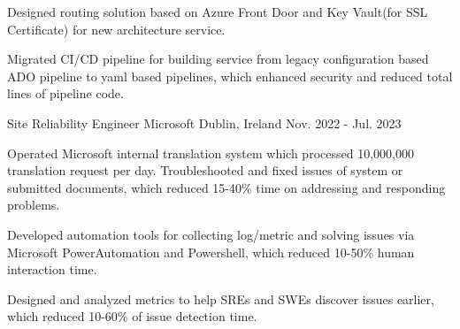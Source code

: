 \begin{cventries}
{\begin{cvitems}
{                }
                \item
                {
                    Designed routing solution based on Azure Front Door and Key Vault(for SSL Certificate) for new architecture service.
                }
                \item
                {
                    Migrated CI/CD pipeline for building service from legacy configuration based ADO pipeline to yaml based pipelines, which enhanced security and reduced total lines of pipeline code.
                }
            \end{cvitems}
        }

    \cventry
        {Site Reliability Engineer}
        {Microsoft}
        {Dublin, Ireland}
        {Nov. 2022 - Jul. 2023}
        {
            \begin{cvitems}
                \item 
                {
                    Operated Microsoft internal translation system which processed 10,000,000 translation request per day. Troubleshooted and fixed issues of system or submitted documents, which reduced 15-40\% time on addressing and responding problems.
                }
                \item 
                {
                    Developed automation tools for collecting log/metric and solving issues via Microsoft PowerAutomation and Powershell, which reduced 10-50\% human interaction time.
                }
                \item 
                {
                    Designed and analyzed metrics to help SREs and SWEs discover issues earlier, which reduced 10-60\% of issue detection time.
                }
            \end{cvitems}
        }


\end{cventries}
